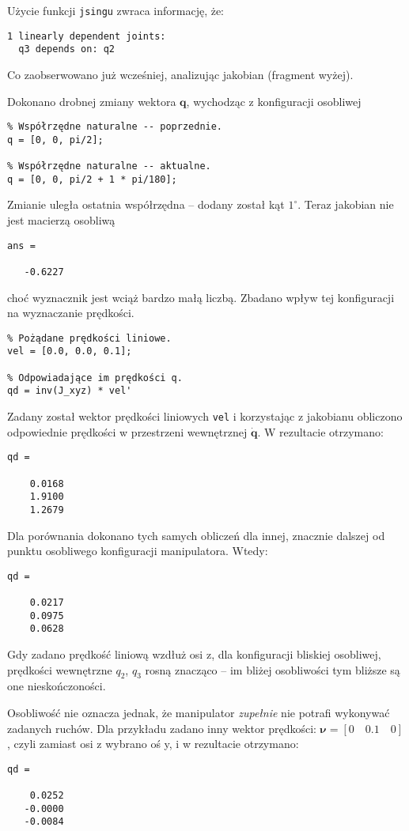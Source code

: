 \documentclass[11pt, a4paper]{article}
\begin{document}
Użycie funkcji \texttt{jsingu} zwraca informację, że:
\begin{lstlisting}[numbers = none]
1 linearly dependent joints:
  q3 depends on: q2 
\end{lstlisting}

Co zaobserwowano już wcześniej, analizując jakobian (fragment wyżej).

Dokonano drobnej zmiany wektora $\mathbf{q}$, wychodząc z konfiguracji osobliwej
\begin{lstlisting}
% Współrzędne naturalne -- poprzednie.
q = [0, 0, pi/2];

% Współrzędne naturalne -- aktualne.
q = [0, 0, pi/2 + 1 * pi/180];
\end{lstlisting}

Zmianie uległa ostatnia współrzędna -- dodany został kąt $1^{\circ}$. Teraz jakobian nie jest macierzą osobliwą
\begin{lstlisting}[numbers = none]
ans =

   -0.6227
\end{lstlisting}

choć wyznacznik jest wciąż bardzo małą liczbą. Zbadano wpływ tej konfiguracji na wyznaczanie prędkości.
\begin{lstlisting}
% Pożądane prędkości liniowe.
vel = [0.0, 0.0, 0.1];

% Odpowiadające im prędkości q.
qd = inv(J_xyz) * vel'
\end{lstlisting}

Zadany został wektor prędkości liniowych \texttt{vel} i korzystając z jakobianu obliczono odpowiednie prędkości w przestrzeni wewnętrznej $\dot{\mathbf{q}}$. W rezultacie otrzymano:
\begin{lstlisting}[numbers = none]
qd =

    0.0168
    1.9100
    1.2679
\end{lstlisting}

Dla porównania dokonano tych samych obliczeń dla innej, znacznie dalszej od punktu osobliwego konfiguracji manipulatora. Wtedy:
\begin{lstlisting}[numbers = none]
qd =

    0.0217
    0.0975
    0.0628
\end{lstlisting}

Gdy zadano prędkość liniową wzdłuż osi z, dla konfiguracji bliskiej osobliwej, prędkości wewnętrzne $q_2$, $q_3$ rosną znacząco -- im bliżej osobliwości tym bliższe są one nieskończoności.

Osobliwość nie oznacza jednak, że manipulator \emph{zupełnie} nie potrafi wykonywać zadanych ruchów. Dla przykładu zadano inny wektor prędkości: $\boldsymbol{\nu} = \left[0 \quad 0.1 \quad 0 \right]$, czyli zamiast osi z wybrano oś y, i w rezultacie otrzymano:
\begin{lstlisting}[numbers = none]
qd =

    0.0252
   -0.0000
   -0.0084
\end{lstlisting}
\end{document}
